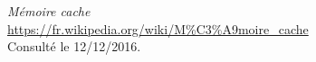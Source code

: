 \renewcommand{\bibname}{Webographie}
\begin{thebibliography}{9}
    \emph{Mémoire cache}\\
    \url{https://fr.wikipedia.org/wiki/M%C3%A9moire_cache}\\
    Consulté le 12/12/2016.
\end{thebibliography}